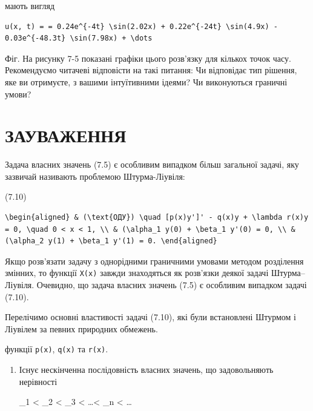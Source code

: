 \documentclass[
  ukrainian,
]{article}
\begin{document}
мають вигляд

\begin{verbatim}
u(x, t) = = 0.24e^{-4t} \sin(2.02x) + 0.22e^{-24t} \sin(4.9x) - 0.03e^{-48.3t} \sin(7.98x) + \dots
\end{verbatim}

Фіг. На рисунку 7-5 показані графіки цього розв'язку для кількох точок
часу. Рекомендуємо читачеві відповісти на такі питання: Чи відповідає
тип рішення, яке ви отримуєте, з вашими інтуїтивними ідеями? Чи
виконуються граничні умови?

\section{ЗАУВАЖЕННЯ}\label{ux437ux430ux443ux432ux430ux436ux435ux43dux43dux44f-4}

Задача власних значень (7.5) є особливим випадком більш загальної
задачі, яку зазвичай називають проблемою Штурма-Ліувіля:

(7.10)

\begin{verbatim}
\begin{aligned} & (\text{ОДУ}) \quad [p(x)y']' - q(x)y + \lambda r(x)y = 0, \quad 0 < x < 1, \\ & (\alpha_1 y(0) + \beta_1 y'(0) = 0, \\ & (\alpha_2 y(1) + \beta_1 y'(1) = 0. \end{aligned}
\end{verbatim}

Якщо розв'язати задачу з однорідними граничними умовами методом
розділення змінних, то функції \texttt{X(x)} завжди знаходяться як
розв'язки деякої задачі Штурма--Ліувіля. Очевидно, що задача власних
значень (7.5) є особливим випадком задачі (7.10).

Перелічимо основні властивості задачі (7.10), які були встановлені
Штурмом і Ліувілем за певних природних обмежень.

функції \texttt{p(x)}, \texttt{q(x)} та \texttt{r(x)}.

\begin{enumerate}
\def\labelenumi{\arabic{enumi}.}
\item
  Існує нескінченна послідовність власних значень, що задовольняють
  нерівності

  \lambda\_1 \textless{} \lambda\_2 \textless{} \lambda\_3 \textless{}
  \ldots \textless{} \lambda\_n \textless{} \ldots \to \infty
\end{enumerate}
\end{document}
